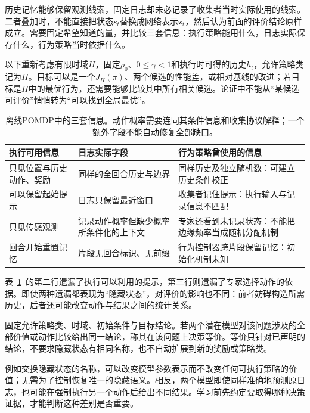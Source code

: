 历史记忆能够保留观测线索，固定日志却未必记录了收集者当时实际使用的线索。二者叠加时，不能直接把状态$s_t$替换成网络表示$\bm z_t$，然后认为前面的评价结论原样成立。需要固定希望知道的量，并比较三套信息：执行策略能用什么，日志实际保存什么，行为策略当时依据什么。

以下重新考虑有限时域$H$，固定$\rho_0$、$0\leq\gamma<1$和执行时可得的历史$h_t$，允许策略类记为$\Pi$。目标可以是一个$J_H(\pi)$、两个候选的性能差，或相对基线的改进；若目标是$\Pi$中的最优行为，还需要能够比较其中所有相关候选。论证中不能从“某候选可评价”悄悄转为“可以找到全局最优”。

\begin{table}[htbp]
  \centering
  \small
  \begin{tabularx}{\linewidth}{XXX}
    \toprule
    执行可用信息 & 日志实际字段 & 行为策略曾使用的信息 \\
    \midrule
    只见位置与历史动作、奖励 & 同样的全回合历史与边界 & 同样历史及独立随机数：可建立历史条件校正 \\
    可以保留起始提示 & 日志只保留最近窗口 & 收集者记住提示：执行输入与记录信息不匹配 \\
    只见传感观测 & 记录动作概率但缺少概率所条件化的上下文 & 专家还看到未记录状态：不能把边缘频率当成随机分配机制 \\
    回合开始重置记忆 & 片段无回合标识、无前缀 & 行为控制器跨片段保留记忆：初始化机制未知 \\
    \bottomrule
  \end{tabularx}
  \caption{离线POMDP中的三套信息。动作概率需要连同其条件信息和收集协议解释；一个额外字段不能自动修复全部缺口。}
  \label{tab:rl-information-information-sets}
\end{table}

表~\ref{tab:rl-information-information-sets}~的第二行遗漏了执行可以利用的提示，第三行则遗漏了专家选择动作的依据。即使两种遗漏都表现为“隐藏状态”，对评价的影响也不同：前者妨碍构造所需历史，后者还可能改变动作与结果之间的统计关系。

\begin{definition}[给定问题上的决策等价]
  \label{def:rl-information-decision-equivalence}
  固定允许策略类、时域、初始条件与目标结论。若两个潜在模型对该问题涉及的全部价值或动作比较给出同一结论，称其在该问题上决策等价。等价只针对已声明的结论，不要求隐藏状态有相同名称，也不自动扩展到新的奖励或策略类。
\end{definition}

例如交换隐藏状态的名称，可以改变模型参数表示而不改变任何可执行策略的价值；无需为了控制恢复唯一的隐藏语义。相反，两个模型即使同样准确地预测原日志，也可能在强制执行另一个动作后给出不同结果。学习前先约定要取得哪种决策证据，才能判断这种差别是否重要。

